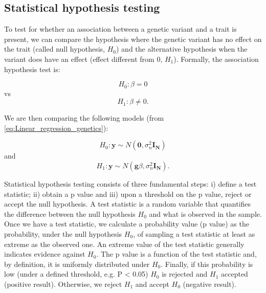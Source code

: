 
\newpage

\subsection{Statistical hypothesis testing}

To test for whether an association between a genetic variant and a trait is present, we can compare the hypothesis where the genetic variant has no effect on the trait (called null hypothesis, $H_0$) and the alternative hypothesis when the variant does have an effect (effect different from 0, $H_1$).
Formally, the association hypothesis test is:

\begin{equation}\label{eq:null_hypothesis}
 H_{0}: \beta=0 
\end{equation}
vs
\begin{equation}\label{eq:alternative_hypothesis}
 H_{1}: \beta \neq 0. 
\end{equation}

We are then comparing the following models (from \eqref{eq:Linear_regression_genetics}):

\begin{equation}\label{eq:null_hypothesis_regression}
 H_0: \mathbf{y} \sim N(\mathbf{0}, \sigma_n^{2} \mathbf{I_N}) 
\end{equation}
and
\begin{equation}\label{eq:alternative_hypothesis_regression}
 H_1: \mathbf{y} \sim N(\mathbf{g}\beta,\sigma_n^{2} \mathbf{I_N}). 
\end{equation}

Statistical hypothesis testing consists of three fundamental steps: i) define a test statistic; ii) obtain a p value and iii) upon a threshold on the p value, reject or accept the null hypothesis. 
A test statistic is a random variable that quantifies the difference between the null hypothesis $H_0$ and what is observed in the sample. 
Once we have a test statistic, we calculate a probability value (p value) as the probability, under the null hypothesis $H_0$, of sampling a test statistic at least as extreme as the observed one. 
An extreme value of the test statistic generally indicates evidence against $H_0$.
The p value is a function of the test statistic and, by definition, it is uniformly distributed under $H_0$.
Finally, if this probability is low (under a defined threshold, e.g. P < 0.05) $H_0$ is rejected and $H_1$ accepted (positive result).
Otherwise, we reject $H_1$ and accept $H_0$ (negative result).\\

